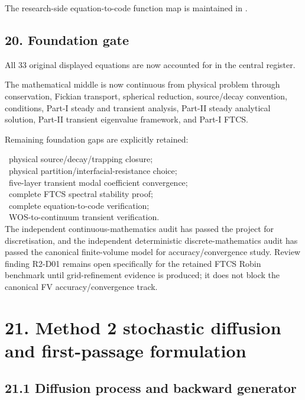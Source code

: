 \documentclass[11pt,a4paper]{article}
\begin{document}
The research-side equation-to-code function map is maintained in .

\subsection*{20. Foundation gate}

All 33 original displayed equations are now accounted for in the central register.

The mathematical middle is now continuous from physical problem through conservation, Fickian transport, spherical reduction, source/decay convention, conditions, Part-I steady and transient analysis, Part-II steady analytical solution, Part-II transient eigenvalue framework, and Part-I FTCS.

Remaining foundation gaps are explicitly retained:

\noindent\textbullet\ physical source/decay/trapping closure;\\
\noindent\textbullet\ physical partition/interfacial-resistance choice;\\
\noindent\textbullet\ five-layer transient modal coefficient convergence;\\
\noindent\textbullet\ complete FTCS spectral stability proof;\\
\noindent\textbullet\ complete equation-to-code verification;\\
\noindent\textbullet\ WOS-to-continuum transient verification.\\

The independent continuous-mathematics audit has passed the project for discretisation, and the independent deterministic discrete-mathematics audit has passed the canonical finite-volume model for accuracy/convergence study. Review finding R2-D01 remains open specifically for the retained FTCS Robin benchmark until grid-refinement evidence is produced; it does not block the canonical FV accuracy/convergence track.

\section*{21. Method 2 stochastic diffusion and first-passage formulation}

\subsection*{21.1 Diffusion process and backward generator}
\end{document}
